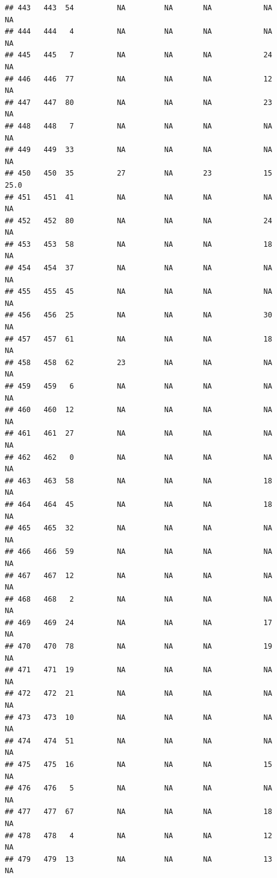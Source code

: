 \documentclass[man]{apa6}
\begin{document}
\begin{verbatim}
## 443   443  54          NA         NA       NA            NA       NA
## 444   444   4          NA         NA       NA            NA       NA
## 445   445   7          NA         NA       NA            24       NA
## 446   446  77          NA         NA       NA            12       NA
## 447   447  80          NA         NA       NA            23       NA
## 448   448   7          NA         NA       NA            NA       NA
## 449   449  33          NA         NA       NA            NA       NA
## 450   450  35          27         NA       23            15     25.0
## 451   451  41          NA         NA       NA            NA       NA
## 452   452  80          NA         NA       NA            24       NA
## 453   453  58          NA         NA       NA            18       NA
## 454   454  37          NA         NA       NA            NA       NA
## 455   455  45          NA         NA       NA            NA       NA
## 456   456  25          NA         NA       NA            30       NA
## 457   457  61          NA         NA       NA            18       NA
## 458   458  62          23         NA       NA            NA       NA
## 459   459   6          NA         NA       NA            NA       NA
## 460   460  12          NA         NA       NA            NA       NA
## 461   461  27          NA         NA       NA            NA       NA
## 462   462   0          NA         NA       NA            NA       NA
## 463   463  58          NA         NA       NA            18       NA
## 464   464  45          NA         NA       NA            18       NA
## 465   465  32          NA         NA       NA            NA       NA
## 466   466  59          NA         NA       NA            NA       NA
## 467   467  12          NA         NA       NA            NA       NA
## 468   468   2          NA         NA       NA            NA       NA
## 469   469  24          NA         NA       NA            17       NA
## 470   470  78          NA         NA       NA            19       NA
## 471   471  19          NA         NA       NA            NA       NA
## 472   472  21          NA         NA       NA            NA       NA
## 473   473  10          NA         NA       NA            NA       NA
## 474   474  51          NA         NA       NA            NA       NA
## 475   475  16          NA         NA       NA            15       NA
## 476   476   5          NA         NA       NA            NA       NA
## 477   477  67          NA         NA       NA            18       NA
## 478   478   4          NA         NA       NA            12       NA
## 479   479  13          NA         NA       NA            13       NA

\end{verbatim}
\end{document}
